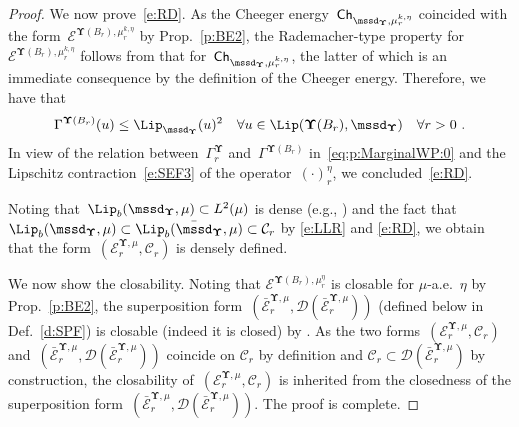 \documentclass[11pt,letterpaper]{amsart}
\newcommand{\Ch}{\mathsf{Ch}}
\newcommand{\dom}[1]{\mathcal D(#1)}
\newcommand{\fstop}{\,\,\mathrm{.}}
\newcommand{\cdc}{\Gamma}
\newcommand{\purple}[1]{{\color{purple}#1}}
\newcommand{\QP}{{\mu}}
\newcommand{\dUpsilon}{{\mathbf \Upsilon}}
\newcommand{\U}{\dUpsilon}
\newcommand{\E}{\mathcal E}
\renewcommand{\1}{\mathbf 1}
\numberwithin{equation}{section}
\theoremstyle{plain}
\theoremstyle{definition}
\theoremstyle{remark}
\begin{document}
\begin{proof}
We now prove~\eqref{e:RD}.
As the Cheeger energy~$\Ch_{\mssd_\U, \QP_r^{k, \eta}}$ coincided with the form~$\E^{\U(B_r), \QP_r^{k, \eta}}$ by Prop.~\ref{p:BE2}, the Rademacher-type property for~$\E^{\U(B_r), \QP_r^{k, \eta}}$ follows from that for~$\Ch_{\mssd_\U, \QP_r^{k, \eta}}$, the latter of which is an immediate consequence by the definition of the Cheeger energy. Therefore, we have that
\begin{align} \label{e:RD2}
\cdc^{\U(B_r)}(u) \le \Lip_{\mssd_\U}(u)^2  \quad \forall u \in \Lip(\U(B_r), \mssd_\U) \quad \forall r>0\fstop
\end{align}
In view of the relation between~$\cdc^\U_r$ and~$\cdc^{\U(B_r)}$ in~\eqref{eq:p:MarginalWP:0} and the Lipschitz contraction~\eqref{e:SEF3} of the operator~$(\cdot)_r^\eta$, we concluded~\eqref{e:RD}. 

Noting that~$\Lip_b(\mssd_\U, \QP) \subset L^2(\mu)$ is dense (e.g., \cite[Prop.\ 4.1]{AmbGigSav14}) and the fact that $\Lip_b(\mssd_\U, \QP) \subset 
\Lip_b(\bar{\mssd}_\U, \QP) \subset \mathcal C_r$ by \eqref{e:LLR} and \eqref{e:RD}, we obtain that the form~$(\E_{r}^{\U, \mu}, \mathcal C_r)$ is densely defined.  

We now show the closability. Noting that $\E^{\U(B_r), \QP_r^\eta}$ is closable for $\mu$-a.e.~$\eta$ by Prop.~\ref{p:BE2},  the superposition form~$(\bar{\E}^{\U, \QP}_r,\dom{\bar{\E}^{\U, \QP}_r})$ (defined below in Def.~\ref{d:SPF}) is closable (indeed it is closed) by \cite[Prop.~V.3.1.1]{BouHir91}. As the two forms~$(\E_{r}^{\U, \mu}, \mathcal C_r)$ and~$(\bar{\E}^{\U, \QP}_r,\dom{\bar{\E}^{\U, \QP}_r})$ coincide on $\mathcal C_r$ by definition and $\mathcal C_r\subset \dom{\bar{\E}^{\U, \QP}_r}$ by construction, the closability of~$(\E_{r}^{\U, \mu}, \mathcal C_r)$ is inherited from the closedness of the superposition form~$(\bar{\E}^{\U, \QP}_r,\dom{\bar{\E}^{\U, \QP}_r})$. 
 The proof is complete.
\end{proof}
\end{document}
